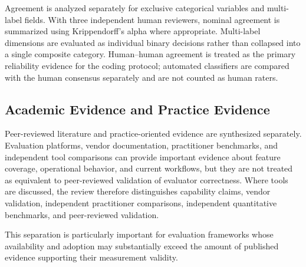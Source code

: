 Agreement is analyzed separately for exclusive categorical variables and multi-label fields. With three independent human reviewers, nominal agreement is summarized using Krippendorff's alpha where appropriate. Multi-label dimensions are evaluated as individual binary decisions rather than collapsed into a single composite category. Human--human agreement is treated as the primary reliability evidence for the coding protocol; automated classifiers are compared with the human consensus separately and are not counted as human raters.


\subsection{Academic Evidence and Practice Evidence}

Peer-reviewed literature and practice-oriented evidence are synthesized separately. Evaluation platforms, vendor documentation, practitioner benchmarks, and independent tool comparisons can provide important evidence about feature coverage, operational behavior, and current workflows, but they are not treated as equivalent to peer-reviewed validation of evaluator correctness. Where tools are discussed, the review therefore distinguishes capability claims, vendor validation, independent practitioner comparisons, independent quantitative benchmarks, and peer-reviewed validation.

This separation is particularly important for evaluation frameworks whose availability and adoption may substantially exceed the amount of published evidence supporting their measurement validity.
